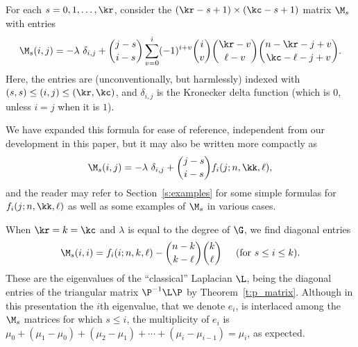 \begin{definition}\label{d:main}
For each $s = 0, 1, \ldots, \kr$, consider the $(\kr-s+1) \times (\kc-s+1)$ matrix $\M_s$ with entries
\[ \M_s(i,j) = -\lambda \ \delta_{i,j} + \binom{j-s}{i-s} \sum_{v=0}^i (-1)^{i+v} \binom{i}{v} \binom{\kr-v}{\ell-v}\binom{n-\kr-j+v}{\kc-\ell-j+v}. \]
Here, the entries are (unconventionally, but harmlessly) indexed with $(s, s) \leq (i, j) \leq (\kr, \kc)$, and $\delta_{i,j}$ is the Kronecker delta function (which is $0$, unless $i = j$ when it is $1$).
\end{definition}

We have expanded this formula for ease of reference, independent from our development in this paper, but it may also be written more compactly as
\[ \M_s(i,j) = -\lambda \ \delta_{i,j} + \binom{j-s}{i-s} f_i(j; n, \kk, \ell), \]
and the reader may refer to Section~\ref{s:examples} for some simple formulas for $f_i(j; n, \kk, \ell)$ as well as some examples of $\M_s$ in various cases.

\begin{remark}\label{r:evs}
When $\kr = k = \kc$ and $\lambda$ is equal to the degree of $\G$, we find diagonal entries
\[ \M_s(i,i) = f_i(i; n, k, \ell) - \binom{n-k}{k-\ell}\binom{k}{\ell} \hspace{0.2in} (\text{for } s \leq i \leq k). \]
These are the eigenvalues of the ``classical'' Laplacian $\L$, being the diagonal entries of the triangular matrix $\P^{-1} \L \P$ by Theorem~\ref{t:p_matrix}.  Although in this presentation the $i$th eigenvalue, that we denote $e_i$, is interlaced among the $\M_s$ matrices for which $s \leq i$, the multiplicity of $e_i$ is 
$\mu_0 + ( \mu_1 - \mu_0 ) + (\mu_2 - \mu_1) + \cdots + (\mu_i - \mu_{i-1}) = \mu_i$,
as expected.
\end{remark}

